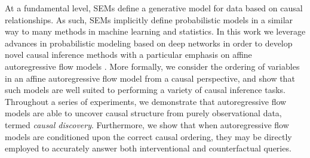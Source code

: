 \documentclass{article}
\begin{document}
At a fundamental level, SEMs define a generative
model for data based on 
causal relationships. %
As such, SEMs 
implicitly 
define probabilistic models
in a similar way to many methods in machine learning and statistics. 
In this work we leverage  advances in 
probabilistic modeling based on deep networks in order to 
develop novel causal inference methods
with a particular emphasis on 
affine autoregressive flow models \citep{papamakarios2019normalizing}.  %
%
More formally,  
we consider the ordering of variables in an affine
autoregressive flow model from a causal perspective, 
and 
show that such models are well suited to performing a variety of 
causal inference tasks. 
%
Throughout a series of experiments, we demonstrate that autoregressive 
flow models are able to uncover causal structure from purely observational data, termed 
\textit{causal discovery}. Furthermore, 
we show that 
when autoregressive flow models are conditioned upon the correct 
causal ordering, they may be directly employed to 
accurately answer both interventional and counterfactual queries. 



%
%
%
%
%
%
%
%
%
%
%
%
\end{document}
